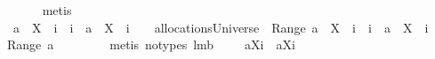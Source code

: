 \begin{isabellebody}
\ \ \ \ \isamarkupfalse%
\ {\isacharparenleft}metis\ {\isachardoublequoteopen}{}{\isachardoublequoteclose}{\isacharparenright}\isanewline
\ \ \isamarkupfalse%
\ {\isachardoublequoteopen}a\ {\isacharminus}{\isacharbar}\ {\isacharparenleft}X\ {\isasymunion}\ {\isacharbraceleft}i{\isacharbraceright}{\isacharparenright}\ {\isasymunion}\ {\isacharbraceleft}i{\isacharbraceright}\ {\isasymtimes}\ {\isacharparenleft}{\isacharbraceleft}{\isasymUnion}{\isacharparenleft}a\ {\isacharbackquote}{\isacharbackquote}\ {\isacharparenleft}X\ {\isasymunion}\ {\isacharbraceleft}i{\isacharbraceright}{\isacharparenright}{\isacharparenright}{\isacharbraceright}\ {\isacharminus}\ {\isacharbraceleft}{\isacharbraceleft}{\isacharbraceright}{\isacharbraceright}{\isacharparenright}\ {\isasymin}\ allocationsUniverse\ {\isasymand}\ {\isasymUnion}Range\ {\isacharparenleft}a\ {\isacharminus}{\isacharbar}\ {\isacharparenleft}X\ {\isasymunion}\ {\isacharbraceleft}i{\isacharbraceright}{\isacharparenright}\ {\isasymunion}\ {\isacharbraceleft}i{\isacharbraceright}\ {\isasymtimes}\ {\isacharparenleft}{\isacharbraceleft}{\isasymUnion}{\isacharparenleft}a\ {\isacharbackquote}{\isacharbackquote}\ {\isacharparenleft}X\ {\isasymunion}\ {\isacharbraceleft}i{\isacharbraceright}{\isacharparenright}{\isacharparenright}{\isacharbraceright}\ {\isacharminus}\ {\isacharbraceleft}{\isacharbraceleft}{\isacharbraceright}{\isacharbraceright}{\isacharparenright}{\isacharparenright}\ {\isacharequal}\ {\isasymUnion}Range\ a{\isachardoublequoteclose}\isanewline
\ \ \ \ \isamarkupfalse%
\ {\isachardoublequoteopen}{}{\isachardoublequoteclose}\ \isamarkupfalse%
\ {\isacharparenleft}metis\ {\isacharparenleft}no{\isacharunderscore}types{\isacharparenright}\ lm{}{}b{\isacharparenright}\isanewline
{}\isamarkupfalse%
\isanewline
{}\isamarkupfalse%
\ \isamarkupfalse%
\ \isanewline
{}{\isacharcolon}\ {\isachardoublequoteopen}{\isacharbraceleft}{\isasymUnion}{\isacharparenleft}a{\isacharbackquote}{\isacharbackquote}{\isacharparenleft}X{\isasymunion}{\isacharbraceleft}i{\isacharbraceright}{\isacharparenright}{\isacharparenright}{\isacharbraceright}{\isacharminus}{\isacharbraceleft}{\isacharbraceleft}{\isacharbraceright}{\isacharbraceright}\ {\isacharequal}\ {\isacharbraceleft}{\isasymUnion}{\isacharparenleft}a{\isacharbackquote}{\isacharbackquote}{\isacharparenleft}X{\isasymunion}{\isacharbraceleft}i{\isacharbraceright}{\isacharparenright}{\isacharparenright}{\isacharbraceright}{\isachardoublequoteclose}\ \isamarkupfalse%

\end{isabellebody}
